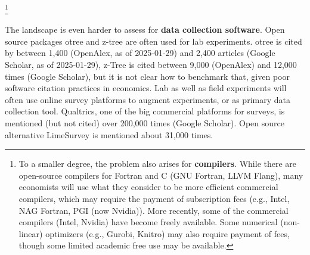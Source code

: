 \documentclass{Revue-economique}
\newcommand{\citep}{\parencite}
\begin{document}
\begin{Article} [%
	Titre={Reproducibility and Open Science in Economics},
	Auteur={Lars Vilhuber\thanks{Cornell University, lars.vilhuber@cornell.edu}}]
\begin{refsection}[Main]
\footnote{To a smaller degree, the problem also arises for \textbf{compilers}. While there are open-source compilers for Fortran and C (GNU Fortran, LLVM Flang), many economists will use what they consider to be more efficient commercial compilers, which may require the payment of  subscription fees (e.g., Intel, NAG Fortran, PGI (now Nvidia)). More recently, some of the commercial compilers (Intel, Nvidia) have become freely available. Some numerical (non-linear) optimizers (e.g., Gurobi, Knitro) may also require payment of fees, though some limited academic free use may be available.}
%

The landscape is even harder to assess for \textbf{data collection software}. Open source packages otree and z-tree are often used for lab experiments. otree is cited  by between 1,400 (OpenAlex, as of 2025-01-29) and 2,400 articles (Google Scholar, as of 2025-01-29), z-Tree is cited between 9,000 (OpenAlex) and 12,000 times (Google Scholar), but it is not clear how to benchmark that, given poor software citation practices in economics. Lab as well as field experiments will often use online survey platforms to augment experiments, or as primary data collection tool. Qualtrics, one of the big commercial platforms for surveys, is mentioned (but not cited) over 200,000 times (Google Scholar). Open source alternative LimeSurvey is mentioned about 31,000 times.




\end{refsection}
\end{Article}
\end{document}
